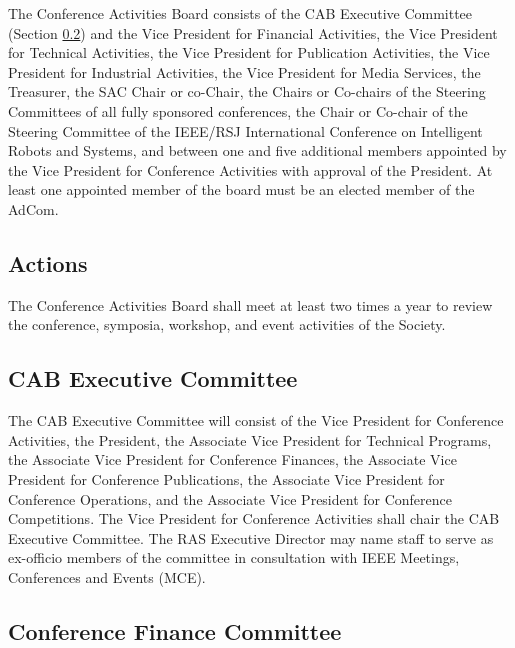 \documentclass[10pt]{article}
\newcommand{\secref}[1]{Section \ref{#1}}
\begin{document}
The Conference Activities Board consists of the CAB Executive Committee (\secref{CAB:ExCom}) and the Vice President for Financial Activities, the Vice President for Technical Activities, the Vice President for Publication Activities,  the Vice President for Industrial Activities, the Vice President for Media Services, the Treasurer, the SAC Chair or co-Chair, the Chairs or Co-chairs of the Steering Committees of all fully sponsored conferences, the Chair or Co-chair of the Steering Committee of the IEEE/RSJ International Conference on Intelligent Robots and Systems, and between one and five additional members appointed by the Vice President for Conference Activities with approval of the President. At least one appointed member of the board must be an elected member of the AdCom.  

\subsection{Actions}

The Conference Activities Board shall meet at least two times a year to review the conference, symposia, workshop, and event activities of the Society.


\subsection{CAB Executive Committee}
\label{CAB:ExCom}

The CAB Executive Committee will consist of the Vice President for Conference Activities, the President, the Associate Vice President for Technical Programs, the Associate Vice President for Conference Finances, the Associate Vice President for Conference Publications, the Associate Vice President for Conference Operations, and the Associate Vice President for Conference Competitions. The Vice President for Conference Activities shall chair the CAB Executive Committee. The RAS Executive Director may name staff to serve as ex-officio members of the committee in consultation with IEEE Meetings, Conferences and Events (MCE).


\subsection{Conference Finance Committee}
\end{document}
